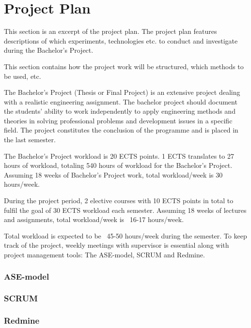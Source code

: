 \chapter{Project Plan}
This section is an excerpt of the project plan. The project plan features descriptions of which experiments, technologies etc. to conduct and investigate during the Bachelor's Project. \newline

This section contains how the project work will be structured, which methods to be used, etc. \newline

The Bachelor’s Project (Thesis or Final Project) is an extensive project dealing with a realistic engineering assignment. The bachelor project should document the students’ ability to work independently to apply engineering methods and theories in solving professional problems and development issues in a specific field. The project constitutes the conclusion of the programme and is placed in the last semester. \newline

The Bachelor's Project workload is 20 ECTS points. 1 ECTS translates to 27 hours of workload, totaling 540 hours of workload for the Bachelor's Project. Assuming 18 weeks of Bachelor's Project work, total workload/week is 30 hours/week. \newline

During the project period, 2 elective courses with 10 ECTS points in total to fulfil the goal of 30 ECTS workload each semester. Assuming 18 weeks of lectures and assignments, total workload/week is ~16-17 hours/week. \newline

Total workload is expected to be ~45-50 hours/week during the semester. To keep track of the project, weekly meetings with supervisor is essential along with project management tools: The ASE-model, SCRUM and Redmine. \newline

\subsection{ASE-model}


\subsection{SCRUM}


\subsection{Redmine}


